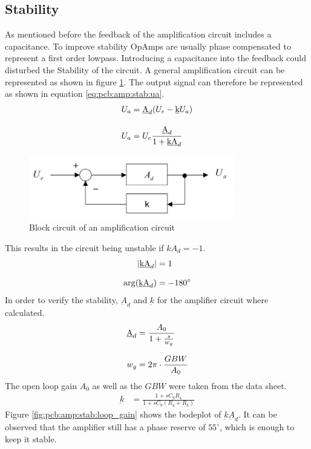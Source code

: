 \subsection{Stability}

As mentioned before the feedback of the amplification circuit includes a capacitance. To improve stability OpAmps are usually phase compensated to represent a first order lowpass. Introducing a capacitance into the feedback could disturbed the Stability of the circuit.\cite{okorn_analoge_2021}\p
A general amplification circuit can be represented as shown in figure \ref{fig:pcb:amp:stab:block}. The output signal can therefore be represented as shown in equation \ref{eq:pcb:amp:stab:ua}.
%
\begin{align}
  U_a &= \underbar{A}_d (U_e - \underbar{k}U_a)\pmath
  U_a &= U_e \cfrac{\underbar{A}_d}{1 + \underbar{k}\underbar{A}_d}\label{eq:pcb:amp:stab:ua}
\end{align}
%
\begin{figure}
  \centering
  \includegraphics[width=0.8\textwidth]{src/assets/pictures/circuit/amp_block_circuit.png}
  \caption{Block circuit of an amplification circuit\cite{okorn_analoge_2021}}\label{fig:pcb:amp:stab:block}
\end{figure}
%
This results in the circuit being unstable if $kA_d = -1$.
%
\begin{align}
  |\underbar{k}\underbar{A}_d| &= 1\pmath
  \arg(\underbar{k}\underbar{A}_d) &= - 180^\circ
\end{align}
%
In order to verify the stability, $\underbar{A}_d$ and $\underbar{k}$ for the amplifier circuit where calculated.
%
\begin{align}
  \underbar{A}_d &= \frac{A_0}{1 + \frac{s}{w_g}}\pmath
  w_g &= 2\pi \cdot \frac{GBW}{A_0}
\end{align}
%
The open loop gain $A_0$ as well as the $GBW$ were taken from the data sheet.\cite{texas_instruments_tl08xx_2021}
%
\begin{align}
  \underbar{k} &= \frac{1 + s C_9 R_4}{1 + s C_9 (R_4 + R_3)}
\end{align}
%
Figure \ref{fig:pcb:amp:stab:loop_gain} shows the bodeplot of $\underbar{k}\underbar{A}_d$. It can be observed that the amplifier still has a phase reserve of $55^\circ$, which is enough to keep it stable.
